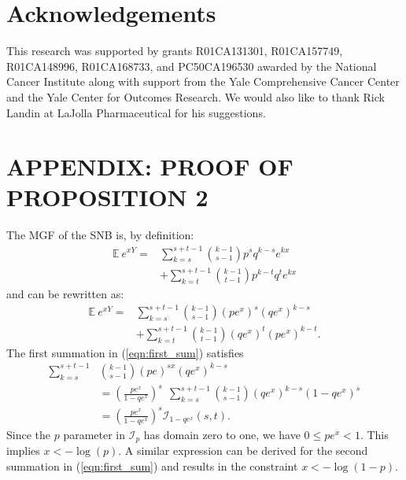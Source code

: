 \documentclass[sii]{ipart}
\begin{document}
\section*{Acknowledgements}
This research was supported by grants R01CA131301, 
R01CA157749, R01CA148996, R01CA168733, and PC50CA196530 awarded by the 
National Cancer Institute along with support from the Yale Comprehensive Cancer 
Center and the Yale Center for Outcomes Research. We would also like 
to thank Rick Landin at LaJolla Pharmaceutical for his suggestions.


\section*{APPENDIX: PROOF OF PROPOSITION 2}
The MGF of the SNB is, by definition:
\begin{align*}
\mathbb{E}~e^{xY} = & \sum_{k=s}^{s+t-1} {k-1 \choose s-1} p^s q^{k-s} e^{kx} \\
  & + \sum_{k=t}^{s+t-1} {k-1 \choose t-1} p^{k-t} q^t e^{kx}
\end{align*}
and can be rewritten as:
\begin{align} \label{eqn:first_sum}
\mathbb{E}~e^{xY} = & \sum_{k=s}^{s+t-1}{k-1 \choose s-1} (pe^x)^{s} (qe^x)^{k-s} \nonumber \\
  & + \sum_{k=t}^{s+t-1}{k-1 \choose t-1} (qe^x)^t (pe^x)^{k-t}.
\end{align}
The first summation in (\ref{eqn:first_sum}) satisfies
\begin{align*}
\sum_{k=s}^{s+t-1} &{k-1 \choose s-1}  (pe)^{sx} (qe^x)^{k-s}  \\
  & = \left(\frac{pe^x}{1 - qe^x}\right)^s \ \ \sum_{k=s}^{s+t-1} {k-1 \choose s-1} 
    (qe^x)^{k-s} (1-qe^x)^s \\
  & = \left(\frac{pe^x}{1 - qe^x}\right)^s \mathcal{I}_{1-qe^x}(s, t).
\end{align*}
Since the $p$ parameter in $\mathcal{I}_p$ has domain zero 
to one, we have $0 \leq pe^x < 1$. This implies $x < -\log(p)$.
A similar expression can be derived for the second summation in 
(\ref{eqn:first_sum}) and results in
the constraint $x < -\log(1-p)$.



\end{document}
